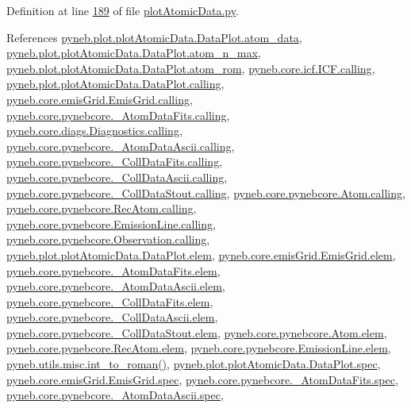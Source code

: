 Definition at line \hyperlink{plot_atomic_data_8py_source_l00189}{189} of file \hyperlink{plot_atomic_data_8py_source}{plot\-Atomic\-Data.\-py}.



References \hyperlink{plot_atomic_data_8py_source_l00071}{pyneb.\-plot.\-plot\-Atomic\-Data.\-Data\-Plot.\-atom\-\_\-data}, \hyperlink{plot_atomic_data_8py_source_l00106}{pyneb.\-plot.\-plot\-Atomic\-Data.\-Data\-Plot.\-atom\-\_\-n\-\_\-max}, \hyperlink{plot_atomic_data_8py_source_l00103}{pyneb.\-plot.\-plot\-Atomic\-Data.\-Data\-Plot.\-atom\-\_\-rom}, \hyperlink{icf_8py_source_l00016}{pyneb.\-core.\-icf.\-I\-C\-F.\-calling}, \hyperlink{plot_atomic_data_8py_source_l00042}{pyneb.\-plot.\-plot\-Atomic\-Data.\-Data\-Plot.\-calling}, \hyperlink{emis_grid_8py_source_l00044}{pyneb.\-core.\-emis\-Grid.\-Emis\-Grid.\-calling}, \hyperlink{pynebcore_8py_source_l00097}{pyneb.\-core.\-pynebcore.\-\_\-\-Atom\-Data\-Fits.\-calling}, \hyperlink{diags_8py_source_l00169}{pyneb.\-core.\-diags.\-Diagnostics.\-calling}, \hyperlink{pynebcore_8py_source_l00318}{pyneb.\-core.\-pynebcore.\-\_\-\-Atom\-Data\-Ascii.\-calling}, \hyperlink{pynebcore_8py_source_l00585}{pyneb.\-core.\-pynebcore.\-\_\-\-Coll\-Data\-Fits.\-calling}, \hyperlink{pynebcore_8py_source_l00936}{pyneb.\-core.\-pynebcore.\-\_\-\-Coll\-Data\-Ascii.\-calling}, \hyperlink{pynebcore_8py_source_l01156}{pyneb.\-core.\-pynebcore.\-\_\-\-Coll\-Data\-Stout.\-calling}, \hyperlink{pynebcore_8py_source_l01229}{pyneb.\-core.\-pynebcore.\-Atom.\-calling}, \hyperlink{pynebcore_8py_source_l02643}{pyneb.\-core.\-pynebcore.\-Rec\-Atom.\-calling}, \hyperlink{pynebcore_8py_source_l03385}{pyneb.\-core.\-pynebcore.\-Emission\-Line.\-calling}, \hyperlink{pynebcore_8py_source_l03541}{pyneb.\-core.\-pynebcore.\-Observation.\-calling}, \hyperlink{plot_atomic_data_8py_source_l00045}{pyneb.\-plot.\-plot\-Atomic\-Data.\-Data\-Plot.\-elem}, \hyperlink{emis_grid_8py_source_l00048}{pyneb.\-core.\-emis\-Grid.\-Emis\-Grid.\-elem}, \hyperlink{pynebcore_8py_source_l00090}{pyneb.\-core.\-pynebcore.\-\_\-\-Atom\-Data\-Fits.\-elem}, \hyperlink{pynebcore_8py_source_l00311}{pyneb.\-core.\-pynebcore.\-\_\-\-Atom\-Data\-Ascii.\-elem}, \hyperlink{pynebcore_8py_source_l00577}{pyneb.\-core.\-pynebcore.\-\_\-\-Coll\-Data\-Fits.\-elem}, \hyperlink{pynebcore_8py_source_l00927}{pyneb.\-core.\-pynebcore.\-\_\-\-Coll\-Data\-Ascii.\-elem}, \hyperlink{pynebcore_8py_source_l01163}{pyneb.\-core.\-pynebcore.\-\_\-\-Coll\-Data\-Stout.\-elem}, \hyperlink{pynebcore_8py_source_l01219}{pyneb.\-core.\-pynebcore.\-Atom.\-elem}, \hyperlink{pynebcore_8py_source_l02636}{pyneb.\-core.\-pynebcore.\-Rec\-Atom.\-elem}, \hyperlink{pynebcore_8py_source_l03389}{pyneb.\-core.\-pynebcore.\-Emission\-Line.\-elem}, \hyperlink{misc_8py_source_l00055}{pyneb.\-utils.\-misc.\-int\-\_\-to\-\_\-roman()}, \hyperlink{plot_atomic_data_8py_source_l00046}{pyneb.\-plot.\-plot\-Atomic\-Data.\-Data\-Plot.\-spec}, \hyperlink{emis_grid_8py_source_l00049}{pyneb.\-core.\-emis\-Grid.\-Emis\-Grid.\-spec}, \hyperlink{pynebcore_8py_source_l00091}{pyneb.\-core.\-pynebcore.\-\_\-\-Atom\-Data\-Fits.\-spec}, \hyperlink{pynebcore_8py_source_l00312}{pyneb.\-core.\-pynebcore.\-\_\-\-Atom\-Data\-Ascii.\-spec}, 